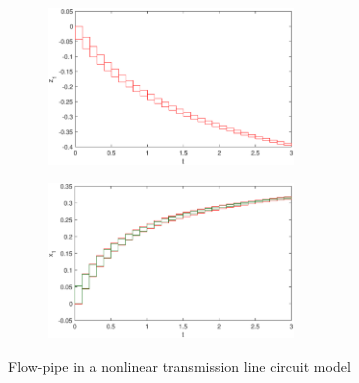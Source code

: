 \documentclass[runningheads,a4paper]{llncs}
\theoremstyle{definition}
\theoremstyle{plain}
\begin{document}
\begin{figure}[h]
\begin{subfigure}{.5\textwidth}
  \centering
   \includegraphics[width=6.5cm]{IC_line_r}
   \parbox{4cm}{\subcaption{}}
\end{subfigure}%
\begin{subfigure}{.5\textwidth}
  \centering
  \includegraphics[width=6.5cm]{IC1compare_flowpip.eps}
  \parbox{4cm}{\subcaption{}}
\end{subfigure}%
 \caption{Flow-pipe in a nonlinear transmission line circuit model}
\label{fig:flowpipe_IC1}
\end{figure}
\end{document}
